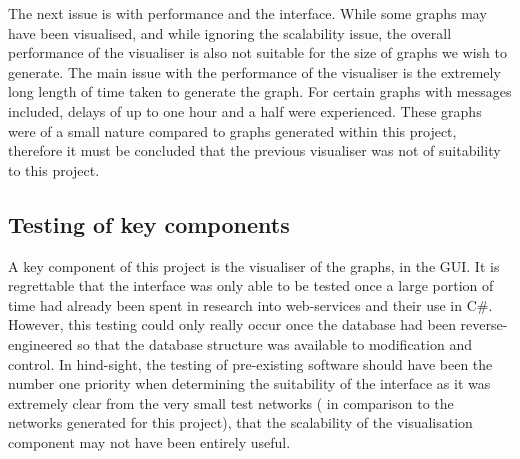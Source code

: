 The next issue is with performance and the interface. While some graphs may have been visualised, and while ignoring the scalability issue, the overall performance of the visualiser is also not suitable for the size of graphs we wish to generate. The main issue with the performance of the visualiser is the extremely long length of time taken to generate the graph. For certain graphs with messages included, delays of up to one hour and a half were experienced. These graphs were of a small nature compared to graphs generated within this project, therefore it must be concluded that the previous visualiser was not of suitability to this project.

\subsection{Testing of key components}

A key component of this project is the visualiser of the graphs, in the GUI. It is regrettable that the interface was only able to be tested once a large portion of time had already been spent in research into web-services and their use in C\#. However, this testing could only really occur once the database had been reverse-engineered so that the database structure was available to modification and control. In hind-sight, the testing of pre-existing software should have been the number one priority when determining the suitability of the interface as it was extremely clear from the very small test networks ( in comparison to the networks generated for this project), that the scalability of the visualisation component may not have been entirely useful.